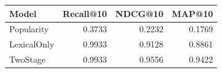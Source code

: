 \begin{tabular}{lrrr}
\toprule
Model & Recall@10 & NDCG@10 & MAP@10 \\
\midrule
Popularity & 0.3733 & 0.2232 & 0.1769 \\
LexicalOnly & 0.9933 & 0.9128 & 0.8861 \\
TwoStage & 0.9933 & 0.9556 & 0.9422 \\
\bottomrule
\end{tabular}
